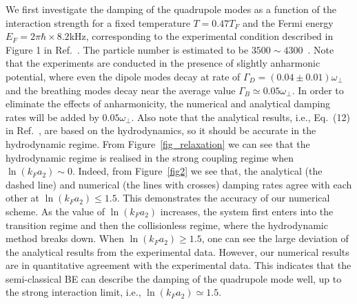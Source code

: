 We first investigate the damping of the quadrupole modes as a function of the interaction strength for a fixed temperature $T=0.47T_F$ and the Fermi energy $E_F=2\pi\hbar\times8.2$kHz, corresponding to the experimental condition described in Figure 1 in Ref.~\cite{Vogt2012}. The particle number is estimated to be $3500\sim4300$~\cite{bruun_2012}. Note that the experiments are conducted in the presence of slightly anharmonic potential, where even the dipole modes decay at rate of $\Gamma_D=(0.04\pm0.01)\omega_\bot$ and the breathing modes decay near the average value $\Gamma_B\simeq0.05\omega_\bot$. In order to eliminate the effects of anharmonicity, the numerical and analytical damping rates will be added by $0.05\omega_\bot$.  Also note that the analytical results, i.e., Eq.~(12) in Ref.~\cite{bruun_2012}, are based on the hydrodynamics, so it should be accurate in the hydrodynamic regime. From Figure~\ref{fig_relaxation} we can see that the hydrodynamic regime is realised in the strong coupling regime when $\ln(k_Fa_2)\sim0$. Indeed, from Figure~\ref{fig2} we see that, the analytical (the dashed line) and numerical (the lines with crosses) damping rates agree with each other at $\ln(k_Fa_2)\leq1.5$. This demonstrates the accuracy of our numerical scheme. As the value of $\ln(k_Fa_2)$ increases, the system first enters into the transition regime and then the collisionless regime, where the hydrodynamic method breaks down. When $\ln(k_Fa_2)\geq1.5$, one can see the large deviation of the analytical results from the experimental data. However, our numerical results are in quantitative agreement with the experimental data. This indicates that the semi-classical BE can describe the damping of the quadrupole mode well, up to the strong interaction limit, i.e., $\ln(k_Fa_2)\simeq1.5$.

